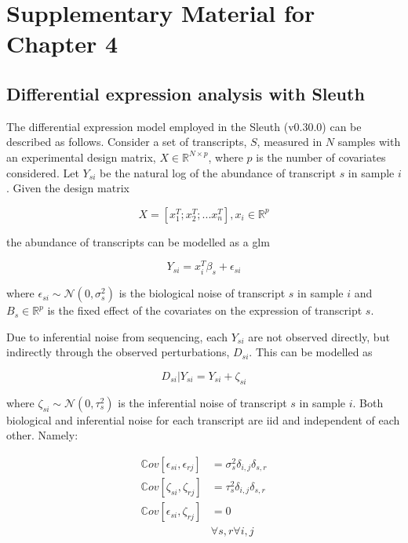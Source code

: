 \chapter{Supplementary Material for Chapter 4}

\section{Differential expression analysis with Sleuth}

The differential expression model employed in the Sleuth (v0.30.0) \cite{pimentelDifferentialAnalysisRNAseq2017,yiGenelevelDifferentialAnalysis2018} can be described as follows.
Consider a set of transcripts, $S$, measured in $N$ samples with an experimental design matrix, $X \in \mathbb{R}^{N \times p}$, where $p$ is the number of covariates considered.
Let $Y_{si}$ be the natural log of the abundance of transcript $s$ in sample $i$.
Given the design matrix

\begin{equation*}
X = [x_1^T; x_2^T; ... x_n^T], x_i \in \mathbb{R}^p
\end{equation*}

the abundance of transcripts can be modelled as a \gls{glm}

\begin{equation}
Y_{si} = x_i^T \beta_s + \epsilon_{si}
\end{equation}

where $\epsilon_{si} \sim \mathcal{N}(0, \sigma_s^2)$ is the biological noise of transcript $s$ in sample $i$ and $B_s \in \mathbb{R}^p$ is the fixed effect of the covariates on the expression of transcript $s$.

Due to inferential noise from sequencing, each $Y_{si}$ are not observed directly, but indirectly through the observed perturbations, $D_{si}$.
This can be modelled as

\begin{equation}
D_{si} | Y_{si} = Y_{si} + \zeta_{si}
\end{equation}

where $\zeta_{si} \sim \mathcal{N}(0, \tau_s^2)$ is the inferential noise of transcript $s$ in sample $i$.
Both biological and inferential noise for each transcript are \gls{iid} and independent of each other.
Namely:

\begin{align*}
\mathbb{C}ov [\epsilon_{si}, \epsilon_{rj}] &= \sigma_s^2\delta_{i,j}\delta_{s,r} \\
\mathbb{C}ov [\zeta_{si}, \zeta_{rj}] &= \tau_s^2\delta_{i,j}\delta_{s,r} \\
\mathbb{C}ov [\epsilon_{si}, \zeta_{rj}] &= 0 \\
  & \forall s,r \forall i,j
\end{align*}

